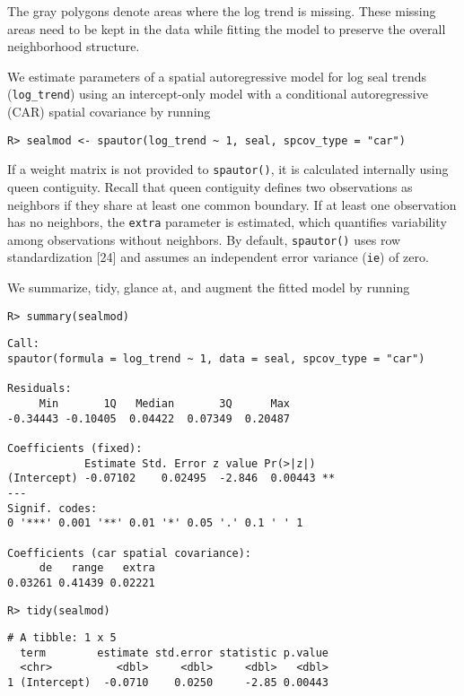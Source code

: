 \documentclass[10pt,letterpaper]{article}
\begin{document}
The gray polygons denote areas where the log trend is missing. These
missing areas need to be kept in the data while fitting the model to
preserve the overall neighborhood structure.

We estimate parameters of a spatial autoregressive model for log seal
trends (\texttt{log\_trend}) using an intercept-only model with a
conditional autoregressive (CAR) spatial covariance by running

\begin{verbatim}
R> sealmod <- spautor(log_trend ~ 1, seal, spcov_type = "car")
\end{verbatim}

If a weight matrix is not provided to \texttt{spautor()}, it is
calculated internally using queen contiguity. Recall that queen
contiguity defines two observations as neighbors if they share at least
one common boundary. If at least one observation has no neighbors, the
\texttt{extra} parameter is estimated, which quantifies variability
among observations without neighbors. By default, \texttt{spautor()}
uses row standardization {[}24{]} and assumes an independent error
variance (\texttt{ie}) of zero.

We summarize, tidy, glance at, and augment the fitted model by running

\begin{verbatim}
R> summary(sealmod)
\end{verbatim}

\begin{verbatim}
Call:
spautor(formula = log_trend ~ 1, data = seal, spcov_type = "car")

Residuals:
     Min       1Q   Median       3Q      Max 
-0.34443 -0.10405  0.04422  0.07349  0.20487 

Coefficients (fixed):
            Estimate Std. Error z value Pr(>|z|)   
(Intercept) -0.07102    0.02495  -2.846  0.00443 **
---
Signif. codes:  
0 '***' 0.001 '**' 0.01 '*' 0.05 '.' 0.1 ' ' 1

Coefficients (car spatial covariance):
     de   range   extra 
0.03261 0.41439 0.02221 
\end{verbatim}

\begin{verbatim}
R> tidy(sealmod)
\end{verbatim}

\begin{verbatim}
# A tibble: 1 x 5
  term        estimate std.error statistic p.value
  <chr>          <dbl>     <dbl>     <dbl>   <dbl>
1 (Intercept)  -0.0710    0.0250     -2.85 0.00443
\end{verbatim}
\end{document}
